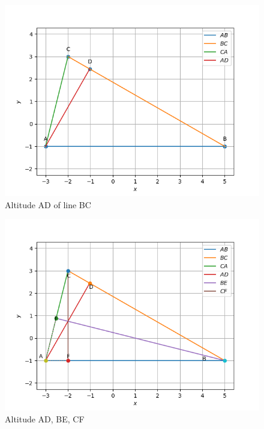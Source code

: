 \documentclass[journal,12pt,twocolumn]{IEEEtran}
\theoremstyle{remark}
\begin{document}
\begin{figure}[!ht]
              \centering
              \includegraphics[width=\columnwidth]{./figs/fig1.3.2.png}
              \caption{Altitude AD of line BC}
              \label{fig:7}
\end{figure}
\begin{figure}[!ht]
              \centering
              \includegraphics[width=\columnwidth]{./figs/fig1.3.3.png}
              \caption{Altitude AD, BE, CF}
              \label{fig:8}
\end{figure}
\end{document}
